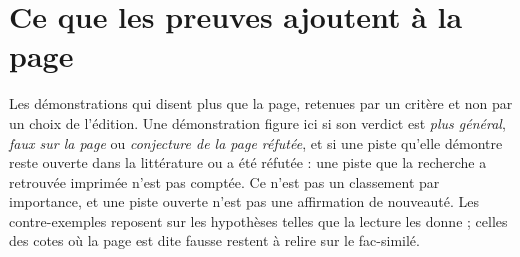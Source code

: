 \section*{Ce que les preuves ajoutent à la page}

Les démonstrations qui disent plus que la page, retenues par un critère et non par un choix de l'édition. Une démonstration figure ici si son verdict est \emph{plus général}, \emph{faux sur la page} ou \emph{conjecture de la page réfutée}, et si une piste qu'elle démontre reste ouverte dans la littérature ou a été réfutée : une piste que la recherche a retrouvée imprimée n'est pas comptée. Ce n'est pas un classement par importance, et une piste ouverte n'est pas une affirmation de nouveauté. Les contre-exemples reposent sur les hypothèses telles que la lecture les donne ; celles des cotes où la page est dite fausse restent à relire sur le fac-similé.

